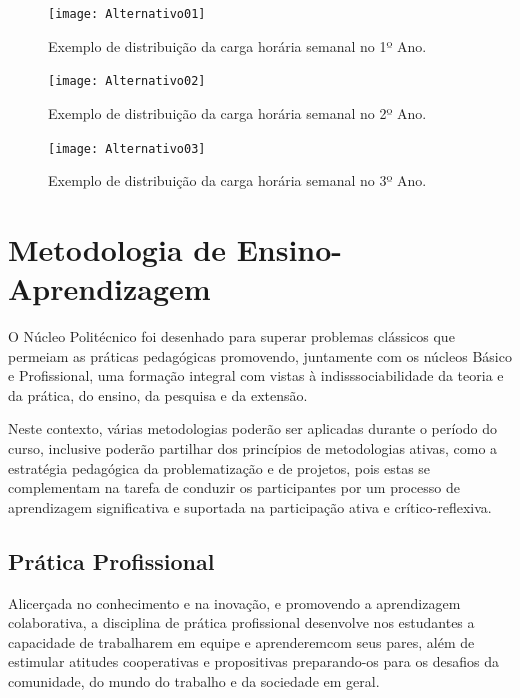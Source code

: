 \documentclass[11pt,fleqn]{book} %
\begin{document}
\begin{figure}[!htp]
	\centering
	\texttt{[image: Alternativo01]}
	\caption{Exemplo de distribuição da carga horária semanal no 1º Ano.}
	\label{fig:DiagramaSemanal01}
\end{figure}

\begin{figure}[!htp]
	\centering	
	\texttt{[image: Alternativo02]}
	\caption{Exemplo de distribuição da carga horária semanal no 2º Ano.}
	\label{fig:DiagramaSemanal02}
\end{figure}

\begin{figure}[!htp]
	\centering	
	\texttt{[image: Alternativo03]}
	\caption{Exemplo de distribuição da carga horária semanal no 3º Ano.}
	\label{fig:DiagramaSemanal03}
\end{figure}

\section{Metodologia de Ensino-Aprendizagem}\label{metodologia}
\indent

O Núcleo Politécnico foi desenhado para superar problemas clássicos que permeiam as práticas pedagógicas promovendo, juntamente com os núcleos Básico e Profissional, uma formação integral com vistas à indisssociabilidade da teoria e da prática, do ensino, da pesquisa e da extensão. 

Neste contexto, várias metodologias poderão ser aplicadas durante o período do curso, inclusive poderão partilhar dos princípios de metodologias ativas, como a estratégia pedagógica da problematização e de projetos, pois estas se complementam na tarefa de conduzir os participantes por um processo de aprendizagem significativa e suportada na participação ativa e crítico-reflexiva. 

\subsection{Prática Profissional}\label{praticasprofissionais}
\indent

Alicerçada no conhecimento e na inovação, e promovendo a aprendizagem colaborativa, a disciplina de prática profissional desenvolve nos estudantes a capacidade de trabalharem em equipe e aprenderemcom seus pares, além de estimular atitudes cooperativas e propositivas preparando-os para os desafios da comunidade, do mundo do trabalho e da sociedade em geral.
\end{document}
